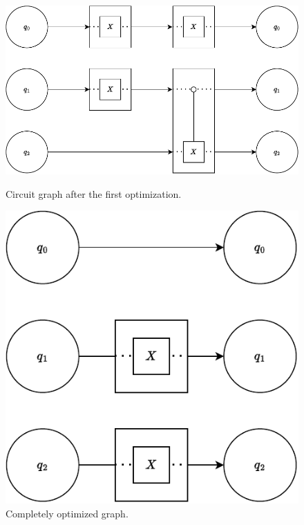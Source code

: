 \begin{figure}[htp]
    \centering     
    \begin{minipage}{.6\textwidth}
        \centering     
        \includegraphics[width=\textwidth]{../figures/circuit_graph_optimized_firststep.pdf}
        \caption{Circuit graph after the first optimization.}
        \label{fig:circuit_graph_first_optimized}
    \end{minipage}
    \hfill
    \begin{minipage}{.35\textwidth}
        \centering     
        \includegraphics[width=\textwidth]{../figures/circuit_graph_optimized_complete.pdf}
        \caption{Completely optimized graph.}
        \label{fig:circuit_graph_optimized_complete}
    \end{minipage}
\end{figure}

